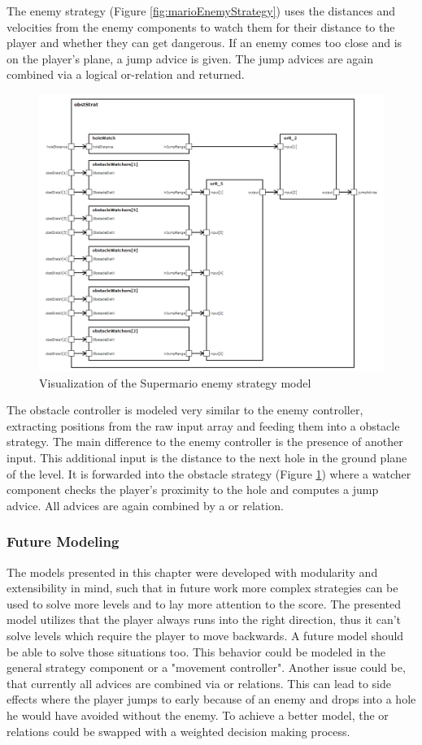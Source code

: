 The enemy strategy (Figure \ref{fig:marioEnemyStrategy}) uses the distances and velocities from the enemy components to watch them for their distance to the player and whether they can get dangerous. If an enemy comes too close and is on the player's plane, a jump advice is given. The jump advices are again combined via a logical or-relation and returned.

\begin{figure}
	\centering
	\includegraphics[scale=0.4]{pictures/haller_obstaclestrategy.PNG}
	\caption{Visualization of the Supermario enemy strategy model}
	\label{fig:marioObstacleStrategy}
\end{figure}

The obstacle controller is modeled very similar to the enemy controller, extracting positions from the raw input array and feeding them into a obstacle strategy. The main difference to the enemy controller is the presence of another input. This additional input is the distance to the next hole in the ground plane of the level. It is forwarded into the obstacle strategy (Figure \ref{fig:marioObstacleStrategy}) where a watcher component checks the player's proximity to the hole and computes a jump advice. All advices are again combined by a or relation.

\subsubsection{Future Modeling}
The models presented in this chapter were developed with modularity and extensibility in mind, such that in future work more complex strategies can be used to solve more levels and to lay more attention to the score.
The presented model utilizes that the player always runs into the right direction, thus it can't solve levels which require the player to move backwards. A future model should be able to solve those situations too. This behavior could be modeled in the general strategy component or a "movement controller".
Another issue could be, that currently all advices are combined via or relations. This can lead to side effects where the player jumps to early because of an enemy and drops into a hole he would have avoided without the enemy. To achieve a better model, the or relations could be swapped with a weighted decision making process.